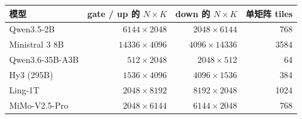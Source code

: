 \begin{tabular}{@{}lrrr@{}}\toprule
模型 & gate / up 的 $N\times K$ & down 的 $N\times K$ & 单矩阵 tiles\\\midrule
Qwen3.5-2B & $6144\times 2048$ & $2048\times 6144$ & 768\\
Ministral 3 8B & $14336\times 4096$ & $4096\times 14336$ & 3584\\
Qwen3.6-35B-A3B & $512\times 2048$ & $2048\times 512$ & 64\\
Hy3 (295B) & $1536\times 4096$ & $4096\times 1536$ & 384\\
Ling-1T & $2048\times 8192$ & $8192\times 2048$ & 1024\\
MiMo-V2.5-Pro & $2048\times 6144$ & $6144\times 2048$ & 768\\
\bottomrule\end{tabular}
